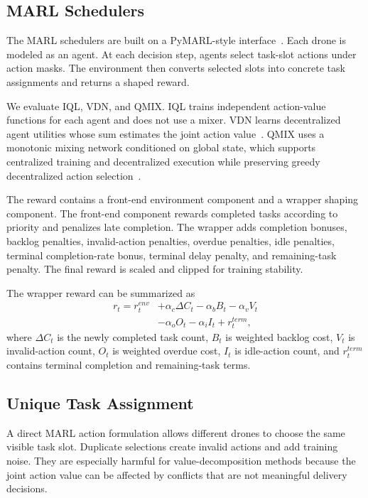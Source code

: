 \documentclass[sigconf,balance=false]{aamas}
\begin{document}
\subsection{MARL Schedulers}

The MARL schedulers are built on a PyMARL-style interface~\cite{pymarl}. Each drone is modeled as an agent. At each decision step, agents select task-slot actions under action masks. The environment then converts selected slots into concrete task assignments and returns a shaped reward.

We evaluate IQL, VDN, and QMIX. IQL trains independent action-value functions for each agent and does not use a mixer. VDN learns decentralized agent utilities whose sum estimates the joint action value~\cite{vdn}. QMIX uses a monotonic mixing network conditioned on global state, which supports centralized training and decentralized execution while preserving greedy decentralized action selection~\cite{qmix}.

The reward contains a front-end environment component and a wrapper shaping component. The front-end component rewards completed tasks according to priority and penalizes late completion. The wrapper adds completion bonuses, backlog penalties, invalid-action penalties, overdue penalties, idle penalties, terminal completion-rate bonus, terminal delay penalty, and remaining-task penalty. The final reward is scaled and clipped for training stability.

The wrapper reward can be summarized as
\begin{equation}
\begin{split}
r_t = r_t^{env} &+ \alpha_c \Delta C_t-\alpha_b B_t-\alpha_v V_t\\
&-\alpha_o O_t-\alpha_i I_t + r_t^{term},
\end{split}
\end{equation}
where $\Delta C_t$ is the newly completed task count, $B_t$ is weighted backlog cost, $V_t$ is invalid-action count, $O_t$ is weighted overdue cost, $I_t$ is idle-action count, and $r_t^{term}$ contains terminal completion and remaining-task terms.

\subsection{Unique Task Assignment}

A direct MARL action formulation allows different drones to choose the same visible task slot. Duplicate selections create invalid actions and add training noise. They are especially harmful for value-decomposition methods because the joint action value can be affected by conflicts that are not meaningful delivery decisions.
\end{document}
